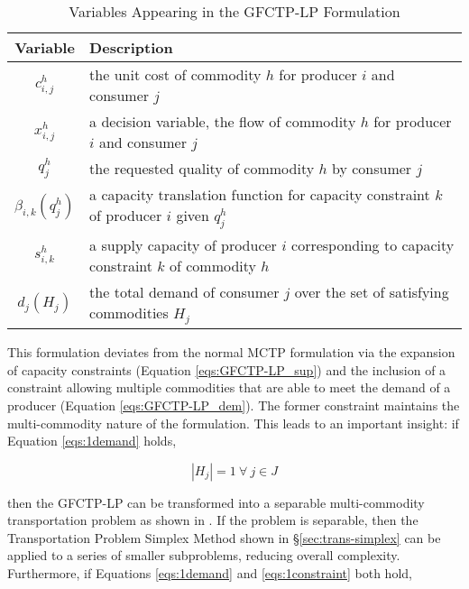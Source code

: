 \begin{table} [h!]
\centering
\begin{tabularx}{\columnwidth-10pt}{|c|X|} %
\hline
Variable    & Description \\
\hline
$c_{i,j}^{h}$             & the unit cost of commodity $h$ 
                          for producer $i$ and consumer $j$  \\
$x_{i,j}^{h}$             & a decision variable, the flow of commodity $h$ 
                          for producer $i$ and consumer $j$  \\
$q_{j}^{h}$               & the requested quality of commodity $h$ 
                          by consumer $j$  \\
$\beta_{i,k}(q_{j}^{h})$  & a capacity translation function for capacity 
                          constraint $k$ of producer $i$ given $q_{j}^{h}$ \\
$s_{i,k}^{h}$             & a supply capacity of producer $i$ corresponding to 
                          capacity constraint $k$ of commodity $h$ \\
$d_{j}(H_{j})$            & the total demand of consumer $j$ over the set of 
                          satisfying commodities $H_{j}$ \\
\hline
\end{tabularx}
\caption{Variables Appearing in the GFCTP-LP Formulation}
\label{tbl:GFCTP-LP-vars}
\end{table}

This formulation deviates from the normal MCTP formulation via the expansion of
capacity constraints (Equation \ref{eqs:GFCTP-LP_sup}) and the inclusion of a
constraint allowing multiple commodities that are able to meet the demand of a
producer (Equation \ref{eqs:GFCTP-LP_dem}). The former constraint maintains the
multi-commodity nature of the formulation. This leads to an important insight: if
Equation \ref{eqs:1demand} holds,

\begin{equation}\label{eqs:1demand}
  \left|{H_{j}}\right| = 1 \: \forall \: j \in J
\end{equation}

then the GFCTP-LP can be transformed into a separable multi-commodity
transportation problem as shown in \cite{bertsekas_network_1998}. If the problem
is separable, then the Transportation Problem Simplex Method shown in
\S\ref{sec:trans-simplex} can be applied to a series of smaller subproblems,
reducing overall complexity. Furthermore, if Equations \ref{eqs:1demand} and
\ref{eqs:1constraint} both hold,

